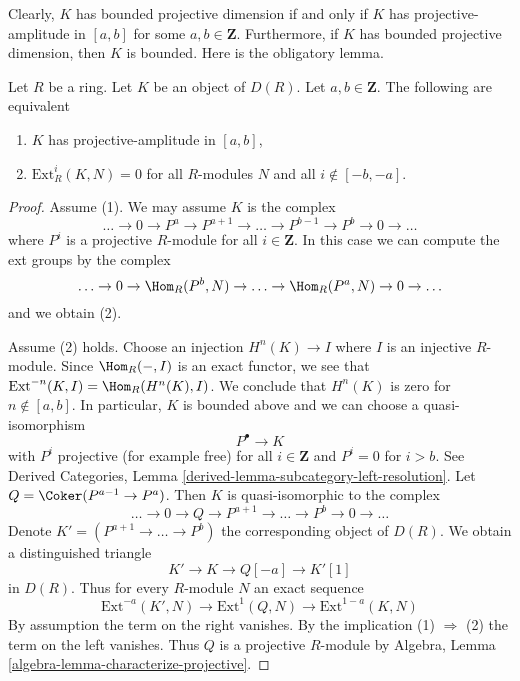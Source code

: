 \noindent
Clearly, $K$ has bounded projective dimension if and only if $K$
has projective-amplitude in $[a, b]$ for some $a, b \in \mathbf{Z}$.
Furthermore, if $K$ has bounded projective dimension, then $K$
is bounded. Here is the obligatory lemma.

\begin{lemma}
\label{lemma-projective-amplitude}
Let $R$ be a ring. Let $K$ be an object of $D(R)$. Let $a, b \in \mathbf{Z}$.
The following are equivalent
\begin{enumerate}
\item $K$ has projective-amplitude in $[a, b]$,
\item $\text{Ext}^i_R(K, N) = 0$ for all $R$-modules $N$ and all
$i \not \in [-b, -a]$.
\end{enumerate}
\end{lemma}

\begin{proof}
Assume (1). We may assume $K$ is the complex
$$
\ldots \to 0 \to P^a \to P^{a + 1} \to \ldots \to
P^{b - 1} \to P^b \to 0 \to \ldots
$$
where $P^i$ is a projective $R$-module for all $i \in \mathbf{Z}$.
In this case we can compute the ext groups by the complex
$$
\ldots \to 0 \to \Hom_R(P^b, N) \to \ldots \to
\Hom_R(P^a, N) \to 0 \to \ldots
$$
and we obtain (2).

\medskip\noindent
Assume (2) holds. Choose an injection $H^n(K) \to I$ where $I$
is an injective $R$-module. Since $\Hom_R(-, I)$ is an exact functor,
we see that $\text{Ext}^{-n}(K, I) = \Hom_R(H^n(K), I)$.
We conclude that $H^n(K)$ is zero for $n \not \in [a, b]$.
In particular, $K$ is bounded above and we can choose a quasi-isomorphism
$$
P^\bullet \to K
$$
with $P^i$ projective (for example free) for all $i \in \mathbf{Z}$ and
$P^i = 0$ for $i > b$. See Derived Categories, Lemma
\ref{derived-lemma-subcategory-left-resolution}.
Let $Q = \Coker(P^{a - 1} \to P^a)$. Then $K$ is quasi-isomorphic
to the complex
$$
\ldots \to 0 \to Q \to P^{a + 1} \to \ldots \to P^b \to 0 \to \ldots
$$
Denote $K' = (P^{a + 1} \to \ldots \to P^b)$ the corresponding object of
$D(R)$. We obtain a distinguished triangle
$$
K' \to K \to Q[-a] \to K'[1]
$$
in $D(R)$. Thus for every $R$-module $N$ an exact sequence
$$
\text{Ext}^{-a}(K', N) \to \text{Ext}^1(Q, N) \to \text{Ext}^{1 - a}(K, N)
$$
By assumption the term on the right vanishes. By the implication
(1) $\Rightarrow$ (2) the term on the left vanishes. Thus $Q$
is a projective $R$-module by
Algebra, Lemma \ref{algebra-lemma-characterize-projective}.
\end{proof}

